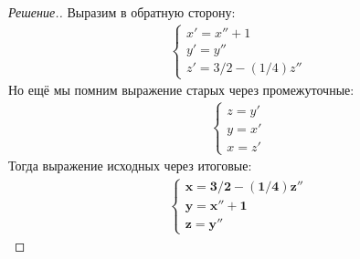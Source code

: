 \documentclass[a4paper]{article}
\theoremstyle{remark}
\begin{document}
\begin{proof}[Решение.]
        Выразим в обратную сторону:
        \begin{align*}
          \begin{cases}
            x' = x'' + 1 \\
            y' = y'' \\
            z' = 3/2 - (1/4)z''
          \end{cases}
        \end{align*}
        Но ещё мы помним выражение старых через промежуточные:
        \begin{align*}
          \begin{cases}
            z = y' \\
            y = x' \\
            x = z'
          \end{cases}
        \end{align*}
        Тогда выражение исходных через итоговые:
        \begin{align*}
          \begin{cases}
            \bm{x = 3/2 - (1/4)z''} \\
            \bm{y = x'' + 1} \\
            \bm{z = y''}
          \end{cases}
        \end{align*}        
        \end{proof}

\end{document}
